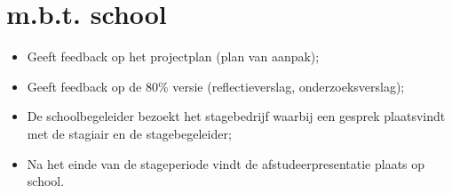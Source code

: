 \newpage
\section{m.b.t. school}
\begin{itemize}
\item Geeft feedback op het projectplan (plan van aanpak);
\item Geeft feedback op de 80\% versie (reflectieverslag, onderzoeksverslag);
\item De schoolbegeleider bezoekt het stagebedrijf waarbij een gesprek plaatsvindt met de stagiair en de stagebegeleider;
\item Na het einde van de stageperiode vindt de afstudeerpresentatie plaats op school.
\end{itemize}